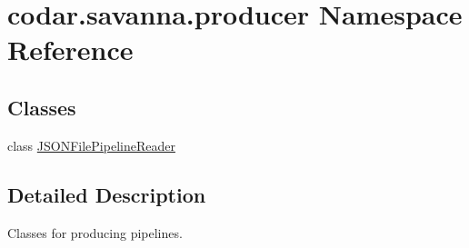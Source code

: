 \hypertarget{namespacecodar_1_1savanna_1_1producer}{}\section{codar.\+savanna.\+producer Namespace Reference}
\label{namespacecodar_1_1savanna_1_1producer}
\subsection*{Classes}
\begin{DoxyCompactItemize}
\item 
class \hyperlink{classcodar_1_1savanna_1_1producer_1_1_j_s_o_n_file_pipeline_reader}{J\+S\+O\+N\+File\+Pipeline\+Reader}
\end{DoxyCompactItemize}


\subsection{Detailed Description}
\begin{DoxyVerb}Classes for producing pipelines.\end{DoxyVerb}
 